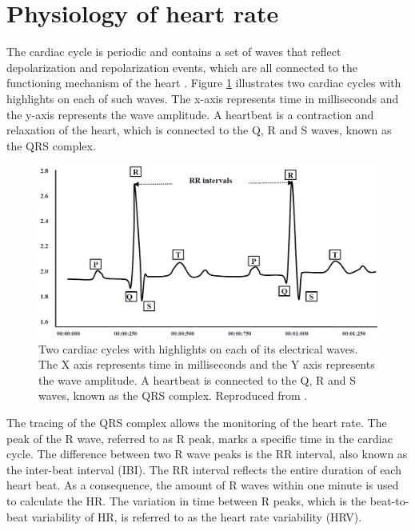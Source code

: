 \section{Physiology of heart rate}

The cardiac cycle is periodic and contains a set of waves that reflect depolarization and repolarization events, which are all connected to the functioning mechanism of the heart \parencite{yanowitz2012introduction}. Figure \ref{fig:rr-interval} illustrates two cardiac cycles with highlights on each of such waves. The x-axis represents time in milliseconds and the y-axis represents the wave amplitude. A heartbeat is a contraction and relaxation of the heart, which is connected to the Q, R and S waves, known as the QRS complex.

\begin{figure}[h!]
    \centering
    \includegraphics[width=1.0\linewidth]{Content/figures/rr-interval.png}
    \caption{Two cardiac cycles with highlights on each of its electrical waves. The X axis represents time in milliseconds and the Y axis represents the wave amplitude. A heartbeat is connected to the Q, R and S waves, known as the QRS complex. Reproduced from \textcite{ahmed2010heart}.}
    \label{fig:rr-interval}
\end{figure}

The tracing of the QRS complex allows the monitoring of the heart rate. The peak of the R wave, referred to as R peak, marks a specific time in the cardiac cycle. The difference between two R wave peaks is the RR interval, also known as the inter-beat interval (IBI). The RR interval reflects the entire duration of each heart beat. As a consequence, the amount of R waves within one minute is used to calculate the HR. The variation in time between R peaks, which is the beat-to-beat variability of HR, is referred to as the heart rate variability (HRV).

